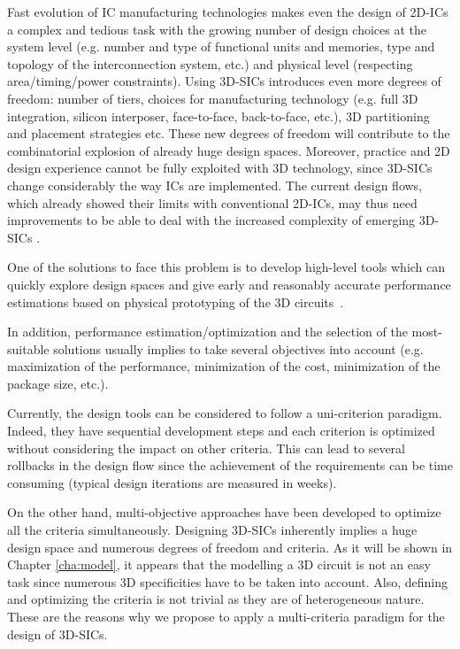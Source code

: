 Fast evolution of IC manufacturing technologies makes even the design of 2D-ICs a complex and tedious task with the growing number of design choices at the system level (e.g. number and type of functional units and memories, type and topology of the interconnection system, etc.) and physical level (respecting area/timing/power constraints). Using 3D-SICs introduces even more degrees of freedom: number of tiers, choices for manufacturing technology (e.g. full 3D integration, silicon interposer, face-to-face, back-to-face, etc.), 3D partitioning and placement strategies etc. These new degrees of freedom will contribute to the combinatorial explosion of already huge design spaces. Moreover, practice and 2D design experience cannot be fully exploited with 3D technology, since 3D-SICs change considerably the way ICs are implemented. The current design flows, which already showed their limits with conventional 2D-ICs, may thus need improvements to be able to deal with the increased complexity of emerging 3D-SICs \cite{vanderbiest06, PFF10}.

One of the solutions to face this problem is to develop high-level tools which can quickly explore design spaces and give early and reasonably accurate performance estimations based on physical prototyping of the 3D circuits~\cite{PFF10}.

In addition, performance estimation/optimization and the selection of the most-suitable solutions usually implies to take several objectives into account (e.g. maximization of the performance, minimization of the cost, minimization of the package size, etc.).

Currently, the design tools can be considered to follow a uni-criterion paradigm. Indeed, they have sequential development steps and each criterion is optimized without considering the impact on other criteria. This can lead to several rollbacks in the design flow since the achievement of the requirements can be time consuming (typical design iterations are measured in weeks).

On the other hand, multi-objective approaches have been developed to optimize all the criteria simultaneously. Designing 3D-SICs inherently implies a huge design space and numerous degrees of freedom and criteria. As it will be shown in Chapter \ref{cha:model}, it appears that the modelling a 3D circuit is not an easy task since numerous 3D specificities have to be taken into account. Also, defining and optimizing the criteria is not trivial as they are of heterogeneous nature. These are the reasons why we propose to apply a multi-criteria paradigm for the design of 3D-SICs.


